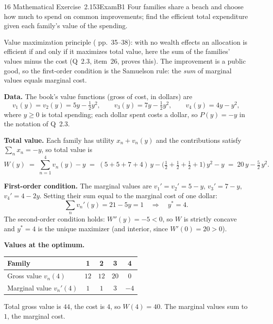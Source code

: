\begin{exsol}{16}{\MR{} Mathematical Exercise~2.1}{53}{Exam}{B1}
\asked Four families share a beach and choose how much to spend on common improvements; find the
efficient total expenditure given each family's value of the spending.

\method Value maximization principle (\MR{} pp.~35--38): with no wealth effects an allocation is
efficient if and only if it maximizes total value, here the sum of the families' values minus the
cost (Q~2.3, item~26, proves this). The improvement is a public good, so the first-order condition
is the Samuelson rule: the \emph{sum} of marginal values equals marginal cost.

\solution
\textbf{Data.} The book's value functions (gross of cost, in dollars) are
\[
  v_1(y) = v_2(y) = 5y - \tfrac12 y^2, \qquad v_3(y) = 7y - \tfrac12 y^2, \qquad v_4(y) = 4y - y^2,
\]
where $y \ge 0$ is total spending; each dollar spent costs a dollar, so $P(y) = -y$ in the
notation of Q~2.3.

\textbf{Total value.} Each family has utility $x_n + v_n(y)$ and the contributions satisfy
$\sum_n x_n = -y$, so total value is
\[
  W(y) \;=\; \sum_{n=1}^{4} v_n(y) - y \;=\; (5+5+7+4)\,y - \big(\tfrac12+\tfrac12+\tfrac12+1\big)\,y^2 - y
  \;=\; 20\,y - \tfrac52\,y^2 .
\]

\textbf{First-order condition.} The marginal values are $v_1' = v_2' = 5 - y$, $v_3' = 7 - y$,
$v_4' = 4 - 2y$. Setting their sum equal to the marginal cost of one dollar:
\[
  \sum_n v_n'(y) = 21 - 5y = 1 \quad\Longrightarrow\quad y^* = 4 .
\]
The second-order condition holds: $W''(y) = -5 < 0$, so $W$ is strictly concave and $y^* = 4$ is the
unique maximizer (and interior, since $W'(0) = 20 > 0$).

\textbf{Values at the optimum.}
\begin{center}
\begin{tabular}{lcccc}
\toprule
Family & 1 & 2 & 3 & 4 \\
\midrule
Gross value $v_n(4)$ & $12$ & $12$ & $20$ & $0$ \\
Marginal value $v_n'(4)$ & $1$ & $1$ & $3$ & $-4$ \\
\bottomrule
\end{tabular}
\end{center}
Total gross value is $44$, the cost is $4$, so $W(4) = 40$. The marginal values sum to $1$, the
marginal cost.


\end{exsol}
